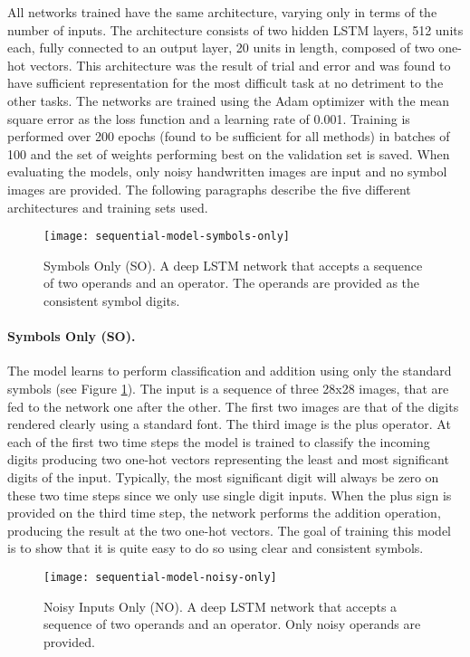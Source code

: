 All networks trained have the same architecture, varying only in terms of the number of inputs. The architecture consists of two hidden LSTM layers, 512 units each, fully connected to an output layer, 20 units in length, composed of two one-hot vectors. This architecture was the result of trial and error and was found to have sufficient representation for the most difficult task at no detriment to the other tasks. The networks are trained using the Adam optimizer with the mean square error as the loss function and a learning rate of 0.001. Training is performed over 200 epochs (found to be sufficient for all methods) in batches of 100 and the set of weights performing best on the validation set is saved.  When evaluating the models, only noisy handwritten images are input and no symbol images are provided. The following paragraphs describe the five different architectures and training sets used.

\begin{figure}[t]
	\centering
	\texttt{[image: sequential-model-symbols-only]}
	\caption{Symbols Only (SO). A deep LSTM network that accepts a sequence of two operands and an operator. The operands are provided as the consistent symbol digits.}
	\label{fig:sequential-model-symbols-only}
\end{figure}

\paragraph{Symbols Only (SO).} The model learns to perform classification and addition using only the standard symbols (see Figure \ref{fig:sequential-model-symbols-only}). The input is a sequence of three 28x28 images, that are fed to the network one after the other. The first two images are that of the digits rendered clearly using a standard font. The third image is the plus operator. At each of the first two time steps the model is trained to classify the incoming digits producing two one-hot vectors representing the least and most significant digits of the input. Typically, the most significant digit will always be zero on these two time steps since we only use single digit inputs. When the plus sign is provided on the third time step, the network performs the addition operation, producing the result at the two one-hot vectors. The goal of training this model is to show that it is quite easy to do so using clear and consistent symbols.

\begin{figure}[t]
	\centering
	\texttt{[image: sequential-model-noisy-only]}
	\caption{Noisy Inputs Only (NO). A deep LSTM network that accepts a sequence of two operands and an operator. Only noisy operands are provided.}
	\label{fig:sequential-model-noisy-only}
\end{figure}

